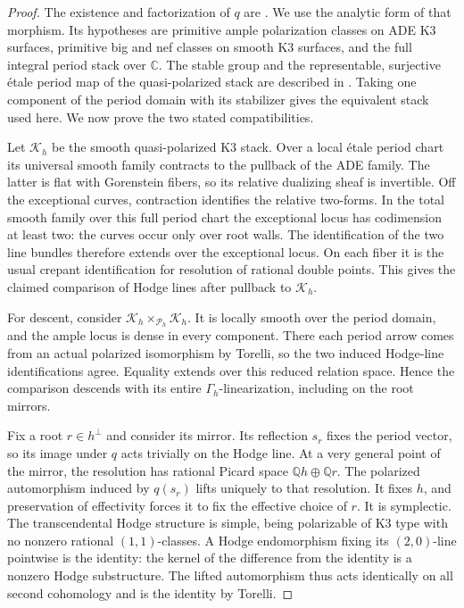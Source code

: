 \documentclass[11pt]{amsart}
\newcommand{\Q}{\mathbb Q}
\newcommand{\C}{\mathbb C}
\theoremstyle{definition}
\theoremstyle{remark}
\numberwithin{equation}{section}
\begin{document}
\begin{proof}
The existence and factorization of \(q\) are
\cite[Lemma~1.12]{DiLorenzoFringuelliVistoli}.  We use the analytic
form of that morphism.  Its hypotheses are primitive ample polarization
classes on ADE K3 surfaces, primitive big and nef classes on smooth K3
surfaces, and the full integral period stack over \(\C\).  The stable
group and the representable, surjective \'etale period map of the
quasi-polarized stack are described in
\cite[Sections~1.6 and~1.8; proof of Lemma~2.6 for surjectivity]{DiLorenzoFringuelliVistoli}.  Taking one
component of the period domain with its stabilizer gives the equivalent
stack used here.  We now prove the two stated compatibilities.

Let \(\mathscr K_h\) be the smooth quasi-polarized K3 stack.  Over a
local \'etale period chart its universal smooth family contracts to the
pullback of the ADE family.  The latter is flat with Gorenstein fibers,
so its relative dualizing sheaf is invertible.  Off the exceptional
curves, contraction identifies the relative two-forms.  In the total
smooth family over this full period chart the exceptional locus has
codimension at least two: the curves occur only over root walls.
The identification of the two line bundles therefore extends over
the exceptional locus.  On each fiber it is the usual crepant
identification for resolution of rational double points.  This gives
the claimed comparison of Hodge lines after pullback to
\(\mathscr K_h\).

For descent, consider
\(\mathscr K_h\times_{\mathscr P_h}\mathscr K_h\).  It is locally
smooth over the period domain, and the ample locus is dense in every
component.  There each period arrow comes from an actual polarized
isomorphism by Torelli, so the two induced Hodge-line identifications
agree.  Equality extends over this reduced relation space.  Hence the
comparison descends with its entire \(\Gamma_h\)-linearization,
including on the root mirrors.

Fix a root \(r\in h^\perp\) and consider its mirror.  Its reflection
\(s_r\) fixes the period vector, so its image under \(q\) acts
trivially on the Hodge line.  At a very general point of the mirror,
the resolution has rational Picard space \(\Q h\oplus\Q r\).
The polarized automorphism induced by \(q(s_r)\) lifts uniquely to
that resolution.  It fixes \(h\), and preservation of effectivity
forces it to fix the effective choice of \(r\).  It is symplectic.
The transcendental Hodge structure is simple, being polarizable of
K3 type with no nonzero rational \((1,1)\)-classes.  A Hodge endomorphism
fixing its \((2,0)\)-line pointwise is the identity: the kernel of the
difference from the identity is a nonzero Hodge substructure.
The lifted automorphism thus acts identically on all second
cohomology and is the identity by Torelli.


\end{proof}
\end{document}
